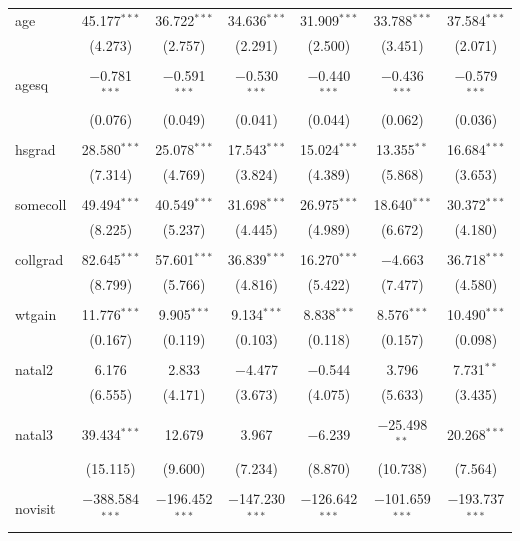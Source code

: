 \documentclass[]{book}
\begin{document}
\begin{table}[!htbp]
\begin{tabular}{@{\extracolsep{5pt}}lcccccc}
 age & 45.177$^{***}$ & 36.722$^{***}$ & 34.636$^{***}$ & 31.909$^{***}$ & 33.788$^{***}$ & 37.584$^{***}$ \\
  & (4.273) & (2.757) & (2.291) & (2.500) & (3.451) & (2.071) \\
  & & & & & & \\
 agesq & $-$0.781$^{***}$ & $-$0.591$^{***}$ & $-$0.530$^{***}$ & $-$0.440$^{***}$ & $-$0.436$^{***}$ & $-$0.579$^{***}$ \\
  & (0.076) & (0.049) & (0.041) & (0.044) & (0.062) & (0.036) \\
  & & & & & & \\
 hsgrad & 28.580$^{***}$ & 25.078$^{***}$ & 17.543$^{***}$ & 15.024$^{***}$ & 13.355$^{**}$ & 16.684$^{***}$ \\
  & (7.314) & (4.769) & (3.824) & (4.389) & (5.868) & (3.653) \\
  & & & & & & \\
 somecoll & 49.494$^{***}$ & 40.549$^{***}$ & 31.698$^{***}$ & 26.975$^{***}$ & 18.640$^{***}$ & 30.372$^{***}$ \\
  & (8.225) & (5.237) & (4.445) & (4.989) & (6.672) & (4.180) \\
  & & & & & & \\
 collgrad & 82.645$^{***}$ & 57.601$^{***}$ & 36.839$^{***}$ & 16.270$^{***}$ & $-$4.663 & 36.718$^{***}$ \\
  & (8.799) & (5.766) & (4.816) & (5.422) & (7.477) & (4.580) \\
  & & & & & & \\
 wtgain & 11.776$^{***}$ & 9.905$^{***}$ & 9.134$^{***}$ & 8.838$^{***}$ & 8.576$^{***}$ & 10.490$^{***}$ \\
  & (0.167) & (0.119) & (0.103) & (0.118) & (0.157) & (0.098) \\
  & & & & & & \\
 natal2 & 6.176 & 2.833 & $-$4.477 & $-$0.544 & 3.796 & 7.731$^{**}$ \\
  & (6.555) & (4.171) & (3.673) & (4.075) & (5.633) & (3.435) \\
  & & & & & & \\
 natal3 & 39.434$^{***}$ & 12.679 & 3.967 & $-$6.239 & $-$25.498$^{**}$ & 20.268$^{***}$ \\
  & (15.115) & (9.600) & (7.234) & (8.870) & (10.738) & (7.564) \\
  & & & & & & \\
 novisit & $-$388.584$^{***}$ & $-$196.452$^{***}$ & $-$147.230$^{***}$ & $-$126.642$^{***}$ & $-$101.659$^{***}$ & $-$193.737$^{***}$ \\

\end{tabular}
\end{table}
\end{document}
